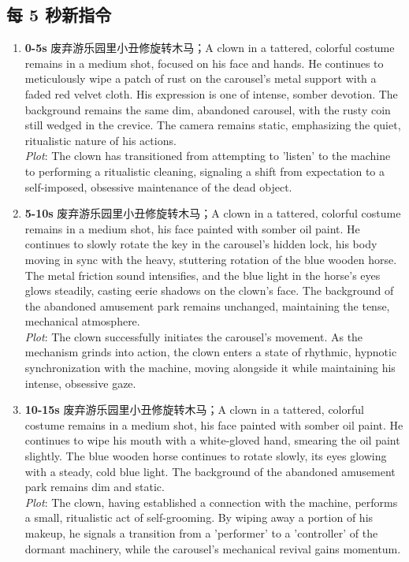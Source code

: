\documentclass[11pt,a4paper]{article}
\begin{document}
\subsection*{每 5 秒新指令}
\begin{enumerate}
\item \textbf{0-5s} 废弃游乐园里小丑修旋转木马；A clown in a tattered, colorful costume remains in a medium shot, focused on his face and hands. He continues to meticulously wipe a patch of rust on the carousel's metal support with a faded red velvet cloth. His expression is one of intense, somber devotion. The background remains the same dim, abandoned carousel, with the rusty coin still wedged in the crevice. The camera remains static, emphasizing the quiet, ritualistic nature of his actions.\\\newline \textit{Plot}: The clown has transitioned from attempting to 'listen' to the machine to performing a ritualistic cleaning, signaling a shift from expectation to a self-imposed, obsessive maintenance of the dead object.
\item \textbf{5-10s} 废弃游乐园里小丑修旋转木马；A clown in a tattered, colorful costume remains in a medium shot, his face painted with somber oil paint. He continues to slowly rotate the key in the carousel's hidden lock, his body moving in sync with the heavy, stuttering rotation of the blue wooden horse. The metal friction sound intensifies, and the blue light in the horse's eyes glows steadily, casting eerie shadows on the clown's face. The background of the abandoned amusement park remains unchanged, maintaining the tense, mechanical atmosphere.\\\newline \textit{Plot}: The clown successfully initiates the carousel's movement. As the mechanism grinds into action, the clown enters a state of rhythmic, hypnotic synchronization with the machine, moving alongside it while maintaining his intense, obsessive gaze.
\item \textbf{10-15s} 废弃游乐园里小丑修旋转木马；A clown in a tattered, colorful costume remains in a medium shot, his face painted with somber oil paint. He continues to wipe his mouth with a white-gloved hand, smearing the oil paint slightly. The blue wooden horse continues to rotate slowly, its eyes glowing with a steady, cold blue light. The background of the abandoned amusement park remains dim and static.\\\newline \textit{Plot}: The clown, having established a connection with the machine, performs a small, ritualistic act of self-grooming. By wiping away a portion of his makeup, he signals a transition from a 'performer' to a 'controller' of the dormant machinery, while the carousel's mechanical revival gains momentum.
\end{enumerate}
\end{document}
